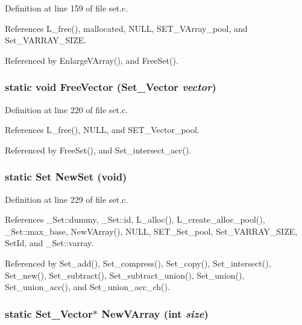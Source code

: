 Definition at line 159 of file set.c.

References L\_\-free(), mallocated, NULL, SET\_\-VArray\_\-pool, and Set\_\-VARRAY\_\-SIZE.

Referenced by Enlarge\-VArray(), and Free\-Set().
\subsubsection{\setlength{\rightskip}{0pt plus 5cm}static void Free\-Vector (\bf{Set\_\-Vector} {\em vector})\hspace{0.3cm}{\tt  [static]}}\label{set_8c_c7f4da647cb0f0bffbf5f12e98a8fc6d}




Definition at line 220 of file set.c.

References L\_\-free(), NULL, and SET\_\-Vector\_\-pool.

Referenced by Free\-Set(), and Set\_\-intersect\_\-acc().
\subsubsection{\setlength{\rightskip}{0pt plus 5cm}static \bf{Set} New\-Set (void)\hspace{0.3cm}{\tt  [static]}}\label{set_8c_8812fbeb38e581945e0874f453405c5d}




Definition at line 229 of file set.c.

References \_\-Set::dummy, \_\-Set::id, L\_\-alloc(), L\_\-create\_\-alloc\_\-pool(), \_\-Set::max\_\-base, New\-VArray(), NULL, SET\_\-Set\_\-pool, Set\_\-VARRAY\_\-SIZE, Set\-Id, and \_\-Set::varray.

Referenced by Set\_\-add(), Set\_\-compress(), Set\_\-copy(), Set\_\-intersect(), Set\_\-new(), Set\_\-subtract(), Set\_\-subtract\_\-union(), Set\_\-union(), Set\_\-union\_\-acc(), and Set\_\-union\_\-acc\_\-ch().
\subsubsection{\setlength{\rightskip}{0pt plus 5cm}static \bf{Set\_\-Vector}$\ast$ New\-VArray (int {\em size})\hspace{0.3cm}{\tt  [static]}}\label{set_8c_6d4508b7b928b37d24901688a7de5eb4}




